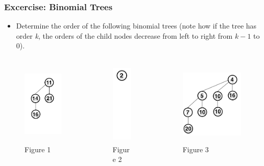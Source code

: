 \documentclass[13pt]{beamer}
\begin{document}
\begin{frame}
\frametitle{Excercise: Binomial Trees}
  \begin{itemize}
    \item Determine the order of the following binomial trees (note how if the tree has order \textit{k}, the orders of the child nodes decrease from left to right from $k-1$ to $0$).
  \end{itemize}

  \begin{columns}[T] %
    \begin{column}[T]{3.3cm} %
      \begin{figure}
        \caption{Figure 1}
        \includegraphics[height=4cm]{order2.png}
      \end{figure}
      \centering
    \end{column}
    \begin{column}[T]{3.3cm} %
      \begin{figure}
        \caption{Figure 2}
        \includegraphics[height=4cm]{order0.png}
      \end{figure}
    \end{column}
    \begin{column}[T]{3.3cm} %
      \begin{figure}
        \caption{Figure 3}
        \includegraphics[height=4cm]{order3.png}

\end{figure}
\end{column}
\end{columns}
\end{frame}
\end{document}
